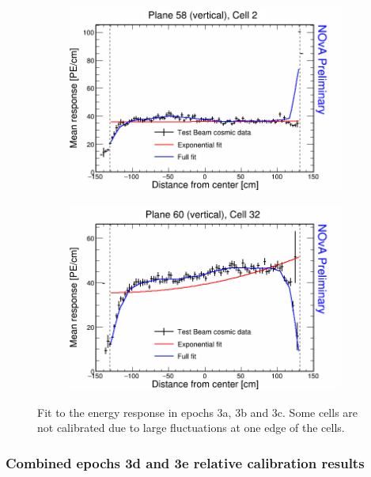 \begin{figure}[h]
  \begin{subfigure}{0.495\textwidth}
    \includegraphics[width=\linewidth]{Plots/RelativeCalibrationResults/ep3abc_058_002.png}
  \end{subfigure}
  \begin{subfigure}{0.495\textwidth}
    \includegraphics[width=\linewidth]{Plots/RelativeCalibrationResults/ep3abc_060_032.png}
  \end{subfigure}
  \caption[Attenuation fits for cells with large fluctuations in period 3 data]{Fit to the energy response in epochs 3a, 3b and 3c. Some cells are not calibrated due to large fluctuations at one edge of the cells.}
  \label{fig:AttenfitResultsEpoch3abc_CellEdges}
\end{figure}

\subsubsection*{Combined epochs 3d and 3e relative calibration results}

